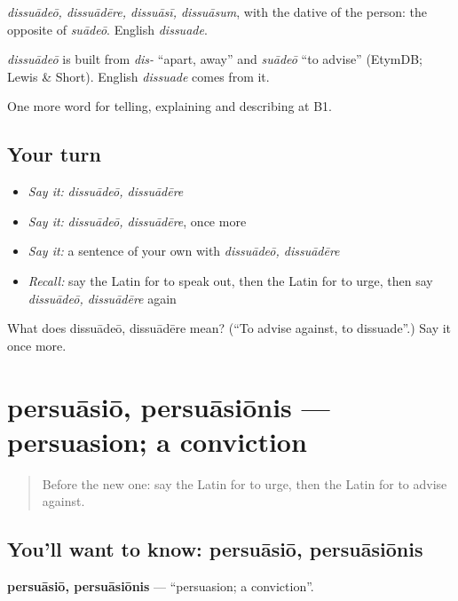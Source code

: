 \emph{dissuādeō, dissuādēre, dissuāsī, dissuāsum}, with the dative of the person: the opposite of \emph{suādeō}. English \emph{dissuade}.

\begin{cousinweb}
\emph{dissuādeō} is built from \emph{dis-} \textquotedblleft{}apart, away\textquotedblright{} and \emph{suādeō} \textquotedblleft{}to advise\textquotedblright{} (EtymDB; Lewis \& Short). English \emph{dissuade} comes from it.
\end{cousinweb}

\begin{grammarlens}[title={What you've built}]
One more word for telling, explaining and describing at B1.
\end{grammarlens}

\subsection*{Your turn}
\begin{itemize}
\raggedright
  \item \emph{Say it:} \emph{dissuādeō, dissuādēre}
  \item \emph{Say it:} \emph{dissuādeō, dissuādēre}, once more
  \item \emph{Say it:} a sentence of your own with \emph{dissuādeō, dissuādēre}
  \item \emph{Recall:} say the Latin for to speak out, then the Latin for to urge, then say \emph{dissuādeō, dissuādēre} again
\end{itemize}

\begin{tcolorbox}[breakable,colback=teal!4,colframe=teal!35!black,title={Before you move on}]
What does dissuādeō, dissuādēre mean? (\textquotedblleft{}To advise against, to dissuade\textquotedblright{}.) Say it once more.
\end{tcolorbox}
\section[persuāsiō, persuāsiōnis]{persuāsiō, persuāsiōnis — persuasion; a conviction}

\label{lesson:LA-C369-persuasio}



\begin{quote}
Before the new one: say the Latin for to urge, then the Latin for to advise against.
\end{quote}

\subsection*{You'll want to know: persuāsiō, persuāsiōnis}
\textbf{persuāsiō, persuāsiōnis} — \textquotedblleft{}persuasion; a conviction\textquotedblright{}.

